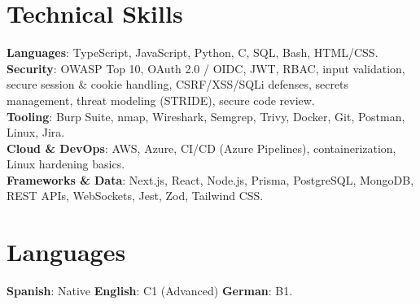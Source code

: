 \documentclass[letterpaper,11pt]{article}
\begin{document}
\section{Technical Skills}
\vspace{-2pt}
 \begin{itemize}[leftmargin=0.15in, label={}]
    \small{\item{
     \textbf{Languages}{: TypeScript, JavaScript, Python, C, SQL, Bash, HTML/CSS.} \\[1mm]
     \textbf{Security}{: OWASP Top 10, OAuth 2.0 / OIDC, JWT, RBAC, input validation, secure session \& cookie handling, CSRF/XSS/SQLi defenses, secrets management, threat modeling (STRIDE), secure code review.} \\[1mm]
     \textbf{Tooling}{: Burp Suite, nmap, Wireshark, Semgrep, Trivy, Docker, Git, Postman, Linux, Jira.} %
     \\[1mm]
     \textbf{Cloud \& DevOps}{: AWS, Azure, CI/CD (Azure Pipelines), containerization, Linux hardening basics.} \\[1mm]
     \textbf{Frameworks \& Data}{: Next.js, React, Node.js, Prisma, PostgreSQL, MongoDB, REST APIs, WebSockets, Jest, Zod, Tailwind CSS.} \\[1mm]
    }}
 \end{itemize}
 \vspace{-16pt}

\section{Languages}
\vspace{-2pt}
 \begin{itemize}[leftmargin=0.15in, label={}]
    \small{\item{
     \textbf{Spanish}: Native \quad\textbar\quad \textbf{English}: C1 (Advanced) \quad\textbar\quad \textbf{German}: B1.
    }}
 \end{itemize}
 \vspace{-10pt}
\end{document}
